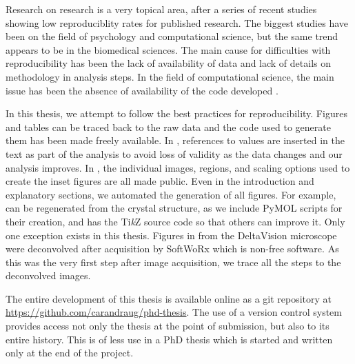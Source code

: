 
Research on research is a very topical area, after a series of recent
studies showing low reproduciblity rates for published research\addref{}.  The
biggest studies have been on the field of psychology and
computational science, but the same trend appears to be in the biomedical
sciences\addref{}.  The main cause for difficulties with
reproducibility has been the lack of availability of
data and lack of details on methodology in analysis steps.
In the field of computational science, the main issue has been the absence of
availability
of the code developed \addref{}.

In this thesis, we attempt to follow the best practices for
reproducibility.  Figures and tables can be traced back to the raw
data and the code used to generate them has been made freely available.  In
, references to values are inserted in the
text as part of the analysis to avoid loss of validity as the data
changes and our analysis improves.  In , the
individual images, regions, and scaling options used to create the
inset figures are all made public.  Even in the introduction and
explanatory sections, we
automated the generation of all figures.  For example,
 can be regenerated from the
crystal structure, as we include PyMOL \addref{} scripts for their creation, and
 has the Ti\textit{k}Z source code so that
others can improve it.  Only one exception exists in this thesis.  Figures in
 from the DeltaVision microscope were deconvolved after
acquisition by SoftWoRx which is non-free software.  As this was the
very first step after image acquisition, we trace all the steps to the
deconvolved images.


The entire development of this thesis is available online as a git
repository at \url{https://github.com/carandraug/phd-thesis}.  The use
of a version control system provides access not only the thesis at the
point of submission, but also to its entire history.  This is of less use
in a PhD thesis which is started and written only at the end of the
project.

